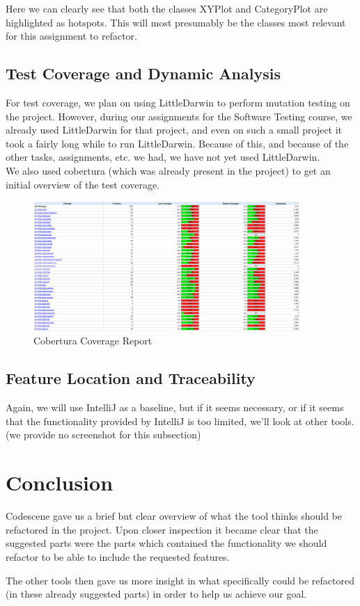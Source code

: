 \documentclass{article}
\begin{document}
Here we can clearly see that both the classes XYPlot and CategoryPlot are highlighted as hotspots. This will most presumably be the classes most relevant for this assignment to refactor.

\newpage
\subsection{Test Coverage and Dynamic Analysis}

For test coverage, we plan on using LittleDarwin to perform mutation testing on the project. However, during our assignments for the Software Testing course, we already used LittleDarwin for that project, and even on such a small project it took a fairly long while to run LittleDarwin. Because of this, and because of the other tasks, assignments, etc. we had, we have not yet used LittleDarwin.\\

We also used cobertura (which was already present in the project) to get an initial overview of the test coverage.

\begin{figure}[H]
\centering
	\includegraphics[width=0.9\textwidth]{cobertura_coverage.png}
	\caption{Cobertura Coverage Report}
\end{figure}

\subsection{Feature Location and Traceability}

Again, we will use IntelliJ as a baseline, but if it seems necessary, or if it seems that the functionality provided by IntelliJ is too limited, we'll look at other tools.\\

\noindent
(we provide no screenshot for this subsection)

\newpage
\section{Conclusion}

Codescene gave us a brief but clear overview of what the tool thinks should be refactored in the project. Upon closer inspection it became clear that the suggested parts were the parts which contained the functionality we should refactor to be able to include the requested features.

The other tools then gave us more insight in what specifically could be refactored (in these already suggested parts) in order to help us achieve our goal.
\end{document}

